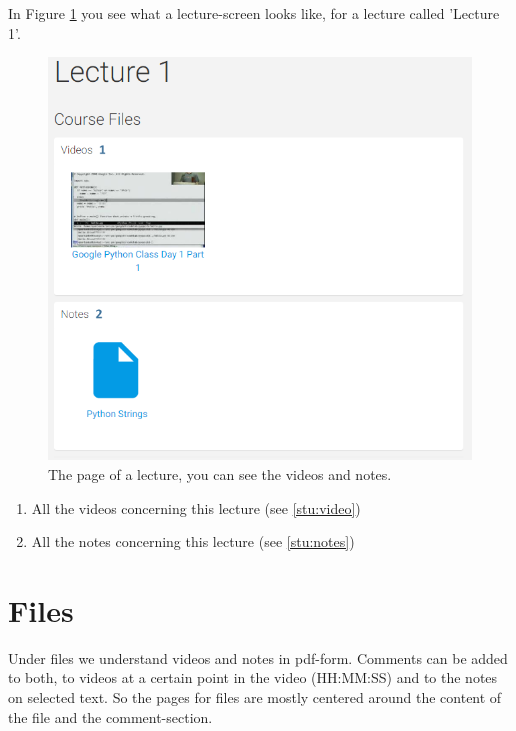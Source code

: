 \documentclass[a4paper,11pt]{report}
\begin{document}
In Figure \ref{fig:stu_lecture} you see what a lecture-screen looks like, for a lecture called 'Lecture 1'.
\begin{figure}[H]
\centering
\includegraphics[scale=0.55]{imgs/stu_lecture.png}
\caption{The page of a lecture, you can see the videos and notes.}
\label{fig:stu_lecture}
\end{figure}
\begin{enumerate}
\item All the videos concerning this lecture (see \ref{stu:video})
\item All the notes concerning this lecture (see \ref{stu:notes})
\end{enumerate}

\section{Files}
\label{stu:files}
Under files we understand videos and notes in pdf-form. Comments can be added to both, to videos at a certain point in the video (HH:MM:SS) and to the notes on selected text. So the pages for files are mostly centered around the content of the file and the comment-section.
\end{document}
